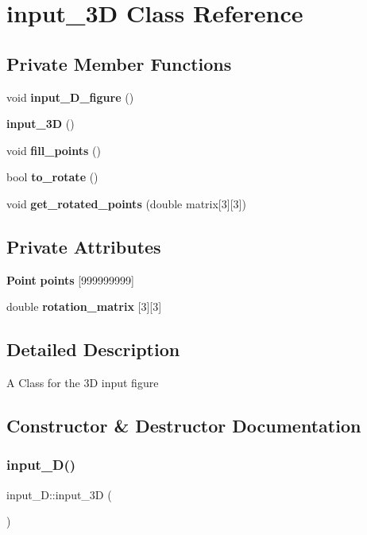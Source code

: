 \section{input\+\_\+3D Class Reference}
\label{classinput__3_d}
\subsection*{Private Member Functions}
\begin{DoxyCompactItemize}
\item 
void \textbf{ input\+\_\+D\+\_\+figure} ()
\item 
\textbf{ input\+\_\+3D} ()
\item 
void \textbf{ fill\+\_\+points} ()
\item 
bool \textbf{ to\+\_\+rotate} ()
\item 
void \textbf{ get\+\_\+rotated\+\_\+points} (double matrix[3][3])
\end{DoxyCompactItemize}
\subsection*{Private Attributes}
\begin{DoxyCompactItemize}
\item 
\textbf{ Point} \textbf{ points} [999999999]
\item 
double \textbf{ rotation\+\_\+matrix} [3][3]
\end{DoxyCompactItemize}


\subsection{Detailed Description}
A Class for the 3D input figure 

\subsection{Constructor \& Destructor Documentation}
\mbox{\label{classinput__3_d_a67ab1573704460a79bb02dc662f10241}} 
\subsubsection{input\+\_\+D()}
{\footnotesize\ttfamily input\+\_\+D\+::input\+\_\+3D (\begin{DoxyParamCaption}{ }\end{DoxyParamCaption})\hspace{0.3cm}{\ttfamily [private]}}

